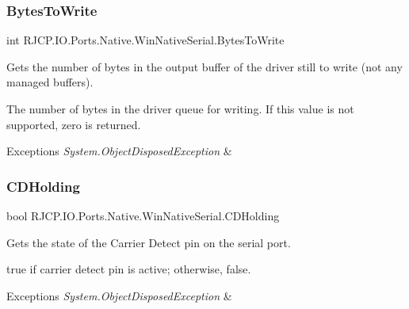 \subsubsection{\texorpdfstring{BytesToWrite}{BytesToWrite}}
{\footnotesize\ttfamily int R\+J\+C\+P.\+I\+O.\+Ports.\+Native.\+Win\+Native\+Serial.\+Bytes\+To\+Write\hspace{0.3cm}{\ttfamily [get]}}



Gets the number of bytes in the output buffer of the driver still to write (not any managed buffers). 

The number of bytes in the driver queue for writing. If this value is not supported, zero is returned. 


\begin{DoxyExceptions}{Exceptions}
{\em System.\+Object\+Disposed\+Exception} & \\
\hline
\end{DoxyExceptions}
\mbox{\label{class_r_j_c_p_1_1_i_o_1_1_ports_1_1_native_1_1_win_native_serial_a1e55b7e746f3f937f1e781ac77e66fc9}} 
\subsubsection{\texorpdfstring{CDHolding}{CDHolding}}
{\footnotesize\ttfamily bool R\+J\+C\+P.\+I\+O.\+Ports.\+Native.\+Win\+Native\+Serial.\+C\+D\+Holding\hspace{0.3cm}{\ttfamily [get]}}



Gets the state of the Carrier Detect pin on the serial port. 

{\ttfamily true} if carrier detect pin is active; otherwise, {\ttfamily false}. 


\begin{DoxyExceptions}{Exceptions}
{\em System.\+Object\+Disposed\+Exception} & \\
\hline
\end{DoxyExceptions}
\mbox{\label{class_r_j_c_p_1_1_i_o_1_1_ports_1_1_native_1_1_win_native_serial_a52a403357d7070da6e2db9943c4f64fe}} 
